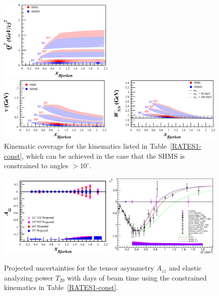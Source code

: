 %


\begin{figure}
\begin{center}
\includegraphics[width=0.49\textwidth]{figs/q2_shms_const.eps}

\includegraphics[width=\textwidth]{figs/nu_wnn_shms_const.eps}

\caption{\label{kincov-const} Kinematic coverage for the kinematics listed in Table~\ref{RATES1-const}, which can be achieved in the case that the SHMS is constrained to angles $>10^{\circ}$.}
\end{center}
\end{figure}



\begin{figure}
\begin{center}
\includegraphics[width=0.49\textwidth]{figs/Azz_shms_const.eps} \includegraphics[width=0.49\textwidth]{figs/t20_shms_const.eps} 
\caption{\label{PROJ-const}Projected uncertainties for the tensor asymmetry $A_{zz}$ and elastic analyzing power $T_{20}$ with \productiondays days of beam time using the constrained kinematics in Table~\ref{RATES1-const}.
}
\end{center}
\end{figure}
\fi